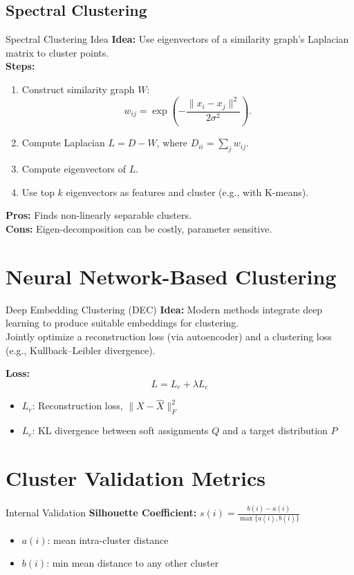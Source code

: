 \documentclass{beamer}
\begin{document}
\subsection{Spectral Clustering}
\begin{frame}{Spectral Clustering Idea}
    \textbf{Idea:} Use eigenvectors of a similarity graph’s Laplacian matrix to cluster points. \\
    \textbf{Steps:}
    \begin{enumerate}
        \item Construct similarity graph $W$:
              \[
                  w_{ij} = \exp\left(-\frac{\|x_i - x_j\|^2}{2\sigma^2}\right).
              \]
        \item Compute Laplacian $L = D - W$, where $D_{ii} = \sum_j w_{ij}$.
        \item Compute eigenvectors of $L$.
        \item Use top $k$ eigenvectors as features and cluster (e.g., with K-means).
    \end{enumerate}
    
    \textbf{Pros:} Finds non-linearly separable clusters.  \\
    \textbf{Cons:} Eigen-decomposition can be costly, parameter sensitive.
\end{frame}

\section{Neural Network-Based Clustering}
\begin{frame}{Deep Embedding Clustering (DEC)}
    \textbf{Idea:} Modern methods integrate deep learning to produce suitable embeddings for clustering.\\
    Jointly optimize a reconstruction loss (via autoencoder) and a clustering loss (e.g., Kullback–Leibler divergence).
    
    \textbf{Loss:}
    \[
        L = L_r + \lambda L_c
    \]
    \begin{itemize}
        \item $L_r$: Reconstruction loss, $\|X - \hat{X}\|_F^2$
        \item $L_c$: KL divergence between soft assignments $Q$ and a target distribution $P$
    \end{itemize}
\end{frame}

\section{Cluster Validation Metrics}
\begin{frame}{Internal Validation}
    \textbf{Silhouette Coefficient:}
    $
        s(i) = \frac{b(i)-a(i)}{\max\{a(i),b(i)\}}
    $
    \begin{itemize}
        \item $a(i)$: mean intra-cluster distance  
        \item $b(i)$: min mean distance to any other cluster
    \end{itemize} 
\end{frame}
\end{document}
